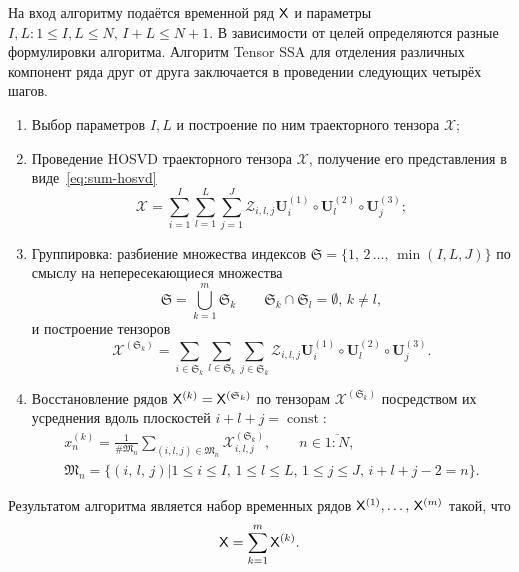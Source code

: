 \documentclass[specialist,
    substylefile = spbu_report.rtx,
    subf,href,colorlinks=true, 12pt]{disser}
\theoremstyle{plain}
\theoremstyle{definition}
\theoremstyle{remark}
\begin{document}
    На вход алгоритму подаётся временной ряд $\mathsf{X}$ и параметры $I,L: 1\leqslant I,L \leqslant N,\, I + L \leqslant N + 1$.
    В зависимости от целей определяются разные формулировки алгоритма.
    Алгоритм Tensor SSA для отделения различных компонент ряда друг от друга заключается в проведении следующих четырёх шагов.
    \begin{enumerate}
        \item Выбор параметров $I, L$ и построение по ним траекторного тензора $\mathcal{X}$;
        \item Проведение HOSVD траекторного тензора $\mathcal{X}$, получение его представления в виде~\eqref{eq:sum-hosvd}
        \begin{equation}
            \mathcal{X}=\sum_{i=1}^{I} \sum_{l=1}^{L} \sum_{j=1}^{J} \mathcal{Z}_{i,l,j} \mathbf{U}^{(1)}_{i}
            \circ \mathbf{U}^{(2)}_{l} \circ \mathbf{U}^{(3)}_{j};
            \label{eq:trajectory-hosvd}
        \end{equation}
        \item Группировка: разбиение множества индексов $\mathfrak{S}=\{1,\, 2\,\ldots,\, \min(I, L, J)\}$ по смыслу на
        непересекающиеся множества
        \[
            \mathfrak{S}=\bigcup_{k=1}^{m}\mathfrak{S}_k \qquad \mathfrak{S}_k\cap \mathfrak{S}_l =\emptyset,\, k\ne l,
        \]
        и построение тензоров
        \begin{equation*}
            \mathcal{X}^{(\mathfrak{S}_k)}=\sum_{i \in \mathfrak{S}_k} \sum_{l\in \mathfrak{S}_k} \sum_{j\in \mathfrak{S}_k}
            \mathcal{Z}_{i,l,j} \mathbf{U}^{(1)}_{i}\circ \mathbf{U}^{(2)}_{l} \circ \mathbf{U}^{(3)}_{j}.
        \end{equation*}
        \item Восстановление рядов $\mathsf{X}^{(k)}=\mathsf{X}^{(\mathfrak{S}_k)}$ по тензорам $\mathcal{X}^{(\mathfrak{S}_k)}$ посредством их усреднения вдоль
        плоскостей $i+l+j=\operatorname{const}$:
        \begin{gather*}
            x^{(k)}_n=\frac{1}{\#\mathfrak{M}_n}\sum_{(i,l,j)\in \mathfrak{M}_n} \mathcal{X}^{(\mathfrak{S}_k)}_{i,l,j},\qquad n\in \overline{1:N},\\
            \mathfrak{M}_n=\{(i,\, l,\, j) | 1\leqslant i \leqslant I,\, 1\leqslant l \leqslant L,\, 1\leqslant j \leqslant J,\, i+l+j-2=n\}.
        \end{gather*}
    \end{enumerate}
    Результатом алгоритма является набор временных рядов $\mathsf{X}^{(1)},\ldots,\, \mathsf{X}^{(m)}$ такой, что
    \[
        \mathsf{X}=\sum_{k=1}^{m}\mathsf{X}^{(k)}.
    \]
\end{document}
